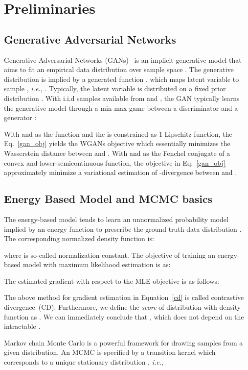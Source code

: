 \documentclass{article}
\begin{document}
\section{Preliminaries}
\subsection{Generative Adversarial Networks}
\label{GANs}
Generative Adversarial Networks (GANs)~\cite{goodfellow2014generative} is an implicit generative model that aims to fit an empirical data distribution  over sample space . The generative distribution  is implied by a generated function , which maps latent variable  to sample , \emph{i.e.}, . Typically, the latent variable  is distributed on a fixed  prior distribution . With i.i.d samples available from  and , the GAN typically learns the generative model through a min-max game between a discriminator  and a generator :

With  and  as the function  and the  is constrained as 1-Lipschitz function, the Eq.~\ref{gan_obj} yields the WGANs objective which essentially minimizes the Wasserstein distance between  and . 
With  and  as the Fenchel conjugate\cite{hiriart2012fundamentals} of a convex and lower-semicontinuous function, the objective in Eq.~\ref{gan_obj} approximately minimize a variational estimation of -divergence\cite{nowozin2016f} between  and .

\subsection{Energy Based Model and MCMC basics}
\label{A}
The energy-based model tends to learn an unnormalized probability model implied by an energy function  to prescribe the ground truth data distribution . The corresponding normalized density function is:

where  is so-called normalization constant.  
The objective of training an energy-based model with maximum likelihood estimation is as:

The estimated gradient with respect to the MLE objective is as follows:

The above method for gradient estimation in Equation~\ref{cd} is called contrastive divergence~(CD). 
Furthermore, we define the \emph{score} of distribution with density function  as . We can immediately conclude that , which does not depend on the intractable .


Markov chain Monte Carlo is a powerful framework for drawing samples from a given distribution. An MCMC is specified by a transition kernel  which corresponds to a unique stationary distribution , \emph{i.e.},
\end{document}
